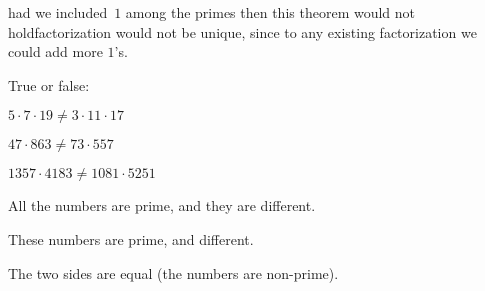 \documentclass{ibl}  %
\begin{document}
\begin{problem}

\end{problem}

\noindent\remark had we included~$1$ among the primes then this theorem would
not
hold\Dash factorization would not be unique, 
since to any existing factorization we could add more $1$'s.

\begin{problem}[\midlength] 
True or false:
\begin{items}
\item $5\cdot 7\cdot 19\neq 3\cdot 11\cdot 17$
\item $47\cdot 863\neq 73\cdot 557$
\item $1357\cdot 4183\neq 1081\cdot 5251$ %
\end{items}
\begin{answer}
\begin{items}
\item All the numbers are prime, and they are different.
\item These numbers are prime, and different.
\item The two sides are equal (the numbers are non-prime).     
\end{items}
\end{answer}
\end{problem}

\end{document}

